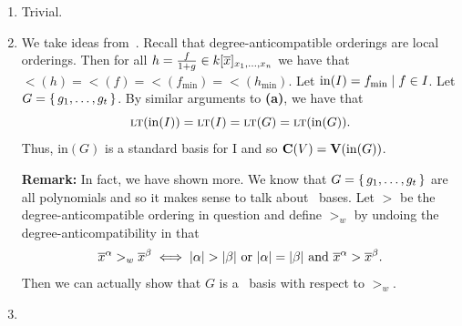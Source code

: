 \documentclass[letterpaper, 11pt, oneside]{book}
\begin{document}
\begin{sol}\label{ex:UAG_4.5.5}
  \begin{enumerate}
    \item Trivial.
    \item We take ideas from~\cite[Proposition 4]{Mora1989}.
          Recall that degree-anticompatible orderings are local orderings.
          Then for all $h = \frac{f}{1 + g} \in k[\overline{x}]_{\ideal{x_{1}, \ldots, x_{n}}}$ we have that $\lt(h) = \lt(f) = \lt(f_{\min}) = \lt(h_{\min})$.
          Let $\mathrm{in}(I) = \ideal{f_{\min} \mid f \in I}$.
          Let $G = \set{g_{1}, \ldots, g_{t}}$.
          By similar arguments to \textbf{(a)}, we have that
          \[
            \ideal{\lt(\mathrm{in}(I))} = \ideal{\lt(I)} = \ideal{\lt(G)} = \ideal{\lt(\mathrm{in}(G))}.
          \]
          Thus, $\mathrm{in}(G)$ is a standard basis for $\mathrm{I}$ and so $\mathbf{C}(V) = \operatorname{\mathbf{V}}(\mathrm{in}(G))$.

          \textbf{Remark:} In fact, we have shown more.
          We know that $G = \set{g_{1}, \ldots, g_{t}}$ are all polynomials and so it makes sense to talk about \Grobner\ bases.
          Let $>$ be the degree-anticompatible ordering in question and define $>_{w}$ by undoing the degree-anticompatibility in that
          \[
            \overline{x}^{\alpha} >_{w} \overline{x}^{\beta} \iff \abs{\alpha} > \abs{\beta} \text{ or } \abs{\alpha} = \abs{\beta} \text{ and } \overline{x}^{\alpha} > \overline{x}^{\beta}.
          \]
          Then we can actually show that $G$ is a \Grobner\ basis with respect to $>_{w}$.
    \item {}
  \end{enumerate}
\end{sol}
\printbibliography
\end{document}
